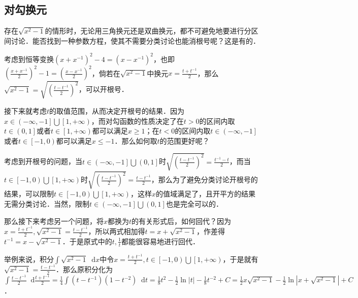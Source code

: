 \documentclass{ctexbook}
\newcommand*{\dif}{\mathop{}\!\mathrm{d}}
\begin{document}
\subsection{对勾换元}
存在$\sqrt{x^{2}-1}$的情形时，无论用三角换元还是双曲换元，都不可避免地要进行分区间讨论．能否找到一种参数方程，使其不需要分类讨论也能消根号呢？这是有的．\par
考虑到恒等变换$\left(x+x^{-1}\right)^{2}-4=\left(x-x^{-1}\right)^{2}$，也即$\left(\frac{x+x^{-1}}{2}\right)^{2}-1=\left(\frac{x-x^{-1}}{2}\right)^{2}$，倘若在$\sqrt{x^{2}-1}$中换元$x=\frac{t+t^{-1}}{2}$，那么$\sqrt{x^{2}-1}=\sqrt{\left(\frac{t-t^{-1}}{2}\right)^{2}}$，可以开根号．\par
接下来就考虑$t$的取值范围，从而决定开根号的结果．因为$x\in\left(-\infty,-1\right]\bigcup\left[1,+\infty\right)$，而对勾函数的性质决定了在$t>0$的区间内取$t\in\left(0,1\right]$或者$t\in\left[1,+\infty\right)$都可以满足$x\ge1$；在$t<0$的区间内取$t\in\left(-\infty,-1\right]$或者$t\in\left[-1,0\right)$都可以满足$x\le-1$．那么如何取$t$的范围更好呢？\par
考虑到开根号的问题，当$t\in\left(-\infty,-1\right]\bigcup\left(0,1\right]$时$\sqrt{\left(\frac{t-t^{-1}}{2}\right)^{2}}=\frac{t^{-1}-t}{2}$，而当$t\in\left[-1,0\right)\bigcup\left[1,+\infty\right)$时$\sqrt{\left(\frac{t-t^{-1}}{2}\right)^{2}}=\frac{t-t^{-1}}{2}$，那么为了避免分类讨论开根号的结果，可以限制$t\in\left[-1,0\right)\bigcup\left[1,+\infty\right)$，这样$x$的值域满足了，且开平方的结果无需分类讨论．当然，限制$t\in\left(-\infty,-1\right]\bigcup\left(0,1\right]$也是完全可以的．\par
那么接下来考虑另一个问题，将$x$都换为$t$的有关形式后，如何回代？因为$x=\frac{t+t^{-1}}{2},\sqrt{x^{2}-1}=\frac{t-t^{-1}}{2}$，所以两式相加得$t=x+\sqrt{x^{2}-1}$，作差得$t^{-1}=x-\sqrt{x^{2}-1}$．于是原式中的$t,\frac{1}{t}$都能很容易地进行回代．\par
举例来说，积分$\int\sqrt{x^{2}-1}\dif{x}$中令$x=\frac{t+t^{-1}}{2},t\in\left[-1,0\right)\bigcup\left[1,+\infty\right)$，于是就有$\sqrt{x^{2}-1}=\frac{t-t^{-1}}{2}$．那么原积分化为$\int\frac{t-t^{-1}}{2}\dif{\frac{t+t^{-1}}{2}}=\frac{1}{4}\int\left(t-t^{-1}\right)\left(1-t^{-2}\right)\dif{t}=\frac{1}{8}t^{2}-\frac{1}{2}\ln{|t|}-\frac{1}{8}t^{-2}+C=\frac{1}{2}x\sqrt{x^{2}-1}-\frac{1}{2}\ln{|x+\sqrt{x^{2}-1}|}+C$．\par
\end{document}
